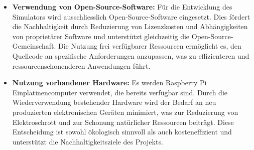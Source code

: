 \documentclass[../../main.tex]{subfiles} %
\begin{document}
\begin{itemize}
  \item \textbf{Verwendung von Open-Source-Software:} Für die
        Entwicklung des Simulators wird ausschliesslich
        Open-Source-Software eingesetzt. Dies fördert die Nachhaltigkeit
        durch Reduzierung von Lizenzkosten und Abhängigkeiten von
        proprietärer Software und unterstützt gleichzeitig die
        Open-Source-Gemeinschaft. Die Nutzung frei verfügbarer Ressourcen
        ermöglicht es, den Quellcode an spezifische Anforderungen
        anzupassen, was zu effizienteren und ressourcenschonenderen
        Anwendungen führt.

  \item \textbf{Nutzung vorhandener Hardware:} Es werden Raspberry Pi
        Einplatinencomputer verwendet, die bereits verfügbar sind. Durch
        die Wiederverwendung bestehender Hardware wird der Bedarf an neu
        produzierten elektronischen Geräten minimiert, was zur
        Reduzierung von Elektroschrott und zur Schonung natürlicher
        Ressourcen beiträgt. Diese Entscheidung ist sowohl ökologisch
        sinnvoll als auch kosteneffizient und unterstützt die
        Nachhaltigkeitsziele des Projekts.
\end{itemize}
\end{document}
